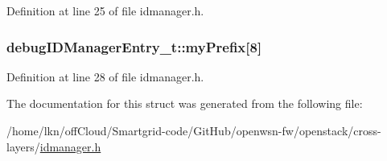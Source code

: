 Definition at line 25 of file idmanager.\+h.

\subsubsection[{\texorpdfstring{my\+Prefix}{myPrefix}}]{ debug\+I\+D\+Manager\+Entry\+\_\+t\+::my\+Prefix\mbox{[}8\mbox{]}}\hypertarget{structdebug_i_d_manager_entry__t_a0b67c04bdc79d66da441905cd40bf130}{}\label{structdebug_i_d_manager_entry__t_a0b67c04bdc79d66da441905cd40bf130}


Definition at line 28 of file idmanager.\+h.



The documentation for this struct was generated from the following file\+:\begin{DoxyCompactItemize}
\item 
/home/lkn/off\+Cloud/\+Smartgrid-\/code/\+Git\+Hub/openwsn-\/fw/openstack/cross-\/layers/\hyperlink{idmanager_8h}{idmanager.\+h}\end{DoxyCompactItemize}
